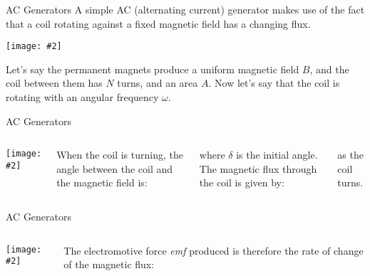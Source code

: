 \documentclass[12pt,aspectratio=169]{beamer}
\newcommand{\pic}[2]{\texttt{[image: \#2]}}
\newcommand{\eq}[2]{\vspace{#1}{\Large\begin{displaymath}#2\end{displaymath}}}
\begin{document}
\begin{frame}{AC Generators}
  A simple AC (alternating current) generator makes use of the fact that a 
  coil rotating against a fixed magnetic field has a changing flux.
  \begin{center}
    \pic{.45}{generator.png}
  \end{center}
  Let's say the permanent magnets produce a uniform magnetic field $B$, and the
  coil between them has $N$ turns, and an area $A$. Now let's say that the coil
  is rotating with an angular frequency $\omega$.
\end{frame}



\begin{frame}{AC Generators}
  \begin{columns}
    \pic{1}{generator.png}

    When the coil is turning, the angle between the coil and the magnetic field
    is:
    
    \eq{-.2in}{
      \theta=\omega t+\delta
    } 

    \vspace{-.1in}where $\delta$ is the initial angle. The magnetic flux
    through the coil is given by:
    
    \vspace{-.4in}{\Large
      \begin{align*}
        \Phi&=NBA\cos\theta\\
        &=NBA\cos(\omega t+\delta)
      \end{align*}
    }
    
    \vspace{-.3in}as the coil turns.
  \end{columns}
\end{frame}



\begin{frame}{AC Generators}
  \begin{columns}
    \pic{1}{generator.png}

    The electromotive force \emph{emf} produced is therefore the rate of change
    of the magnetic flux:

  \end{columns}
\end{frame}
\end{document}
